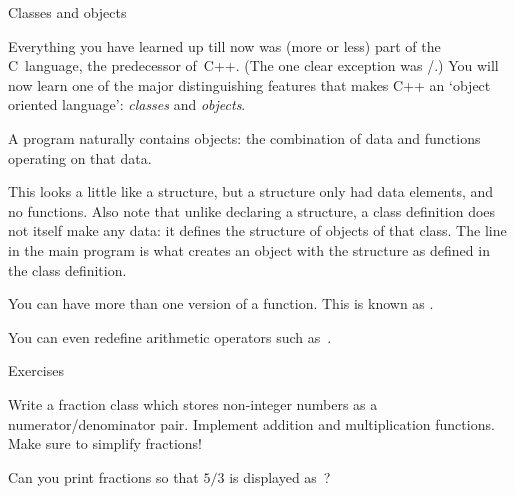 
 {Classes and objects}
\label{sec:class}

Everything you have learned up till now was (more or less) part of the
C~language, the predecessor of~C++. (The one clear exception was
/.) You will now learn one of the major distinguishing
features that makes C++ an `object oriented language':
\emph{classes} and
\emph{objects}.

A program naturally contains objects: the combination of data
and functions operating on that data.
%

This looks a little like a structure, but a structure only had data
elements, and no functions. Also note that unlike declaring a
structure, a class definition  does not itself make any data: it
defines the structure of objects of that class. The line in the main
program is what creates an object with the structure as defined in the
class definition.

You can have more than one version of a function. This is known as
.
%

You can even redefine arithmetic operators such as~\n{+*/\%}.

 {Exercises}

\begin{exercise}
  Write a fraction class which stores non-integer numbers as a
  numerator/denominator pair. Implement addition and multiplication
  functions. Make sure to simplify fractions!

  Can you print fractions so that $5/3$ is displayed as~\hbox{}?
\end{exercise}
